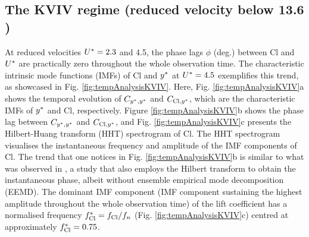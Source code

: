 \documentclass[oneside]{utmthesis}
\begin{document}
\subsection{The KVIV regime (reduced velocity below 13.6 )} \label{ssec:phaseLag}
At reduced velocities  $U^{*} = 2.3$ and 4.5, the phase lags  $\phi$ (deg.) between Cl and  $U^{*}$ are practically zero throughout the whole observation time. The characteristic intrinsic mode functions (IMFs) of Cl and  $y^{*}$ at $U^{*} = 4.5$ exemplifies this trend, as showcased in Fig. \ref{fig:tempAnalysisKVIV}. Here, Fig. \ref{fig:tempAnalysisKVIV}a shows the temporal evolution of $C_{y^{*},y^{*}}$ and $C_{\text{Cl},y^{*}}$, which are the characteristic IMFs of $y^{*}$ and Cl, respectively. Figure \ref{fig:tempAnalysisKVIV}b shows the phase lag between $C_{y^{*},y^{*}}$ and $C_{\text{Cl},y^{*}}$, and Fig. \ref{fig:tempAnalysisKVIV}c presents the Hilbert-Huang transform (HHT) spectrogram of Cl. The HHT spectrogram visualises the instantaneous frequency and amplitude of the IMF components of Cl. The trend that one notices in Fig. \ref{fig:tempAnalysisKVIV}b is similar to what was observed in \citet{Khalak1999}, a study that also employs the Hilbert transform to obtain the instantaneous phase, albeit without ensemble empirical mode decomposition (EEMD). The dominant IMF component (IMF component sustaining the highest amplitude throughout the whole observation time) of the lift coefficient has a normalised frequency $f_{\text{Cl}}^{*} = f_{\text{Cl}}/f_{n}$ (Fig. \ref{fig:tempAnalysisKVIV}c) centred at approximately $f_{\text{Cl}}^{*} = 0.75$.
\end{document}
